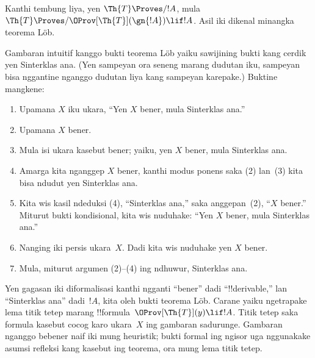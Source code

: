 \documentclass[../../../include/open-logic-section]{subfiles}
\begin{document}
Kanthi tembung liya, yen $\Th{T} \Proves/ !A$, mula $\Th{T} \Proves/
\OProv[\Th{T}](\gn{!A}) \lif !A$. Asil iki dikenal minangka
teorema L\"ob.

\begin{explain}
Gambaran intuitif kanggo bukti teorema L\"ob yaiku sawijining bukti
kang cerdik yen Sinterklas ana. (Yen sampeyan ora seneng marang
dudutan iku, sampeyan bisa nggantine nganggo dudutan liya kang
sampeyan karepake.) Buktine mangkene:
\begin{enumerate}
\item Upamana $X$ iku ukara, ``Yen $X$ bener, mula Sinterklas ana.''
\item Upamana $X$ bener.
\item Mula isi ukara kasebut bener; yaiku, yen $X$
  bener, mula Sinterklas ana.
\item Amarga kita nganggep $X$ bener, kanthi modus ponens saka
  (2) lan~(3) kita bisa ndudut yen Sinterklas ana.
\item Kita wis kasil ndeduksi (4), ``Sinterklas ana,'' saka
  anggepan~(2), ``$X$ bener.'' Miturut bukti kondisional,
  kita wis nuduhake: ``Yen $X$ bener, mula Sinterklas ana.''
\item Nanging iki persis ukara~$X$. Dadi kita wis nuduhake yen
  $X$ bener.
\item Mula, miturut argumen (2)--(4) ing ndhuwur, Sinterklas ana.
\end{enumerate}
Yen gagasan iki diformalisasi kanthi ngganti ``bener'' dadi
``!!{derivable},'' lan ``Sinterklas ana'' dadi~$!A$,
kita oleh bukti teorema L\"ob. Carane yaiku ngetrapake lema
titik tetep marang !!{formula}~$\OProv[\Th{T}](y) \lif !A$.
Titik tetep saka formula kasebut cocog karo ukara~$X$ ing
gambaran sadurunge. Gambaran nganggo bebener naif iki mung heuristik; bukti formal ing ngisor uga nggunakake asumsi refleksi kang kasebut ing teorema, ora mung lema titik tetep.
\end{explain}
\end{document}
